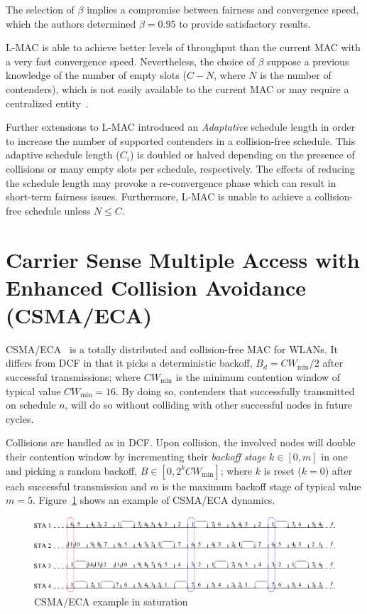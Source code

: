 \documentclass[a4paper,journal]{IEEEtran}
\begin{document}
The selection of $\beta$ implies a compromise between fairness and convergence speed, which the authors determined $\beta=0.95$ to provide satisfactory results.

L-MAC is able to achieve better levels of throughput than the current MAC with a very fast convergence speed. Nevertheless, the choice of $\beta$ suppose a previous knowledge of the number of empty slots ($C-N$, where $N$ is the number of contenders), which is not easily available to the current MAC or may require a centralized entity~\cite{barcelo2011tcf}.

Further extensions to L-MAC introduced an \emph{Adaptative} schedule length in order to increase the number of supported contenders in a collision-free schedule. This adaptive schedule length ($C_{i}$) is doubled or halved depending on the presence of collisions or many empty slots per schedule, respectively. The effects of reducing the schedule length may provoke a re-convergence phase which can result in short-term fairness issues. Furthermore, L-MAC is unable to achieve a collision-free schedule unless $N\leq C$.

\section{Carrier Sense Multiple Access with Enhanced Collision Avoidance (CSMA/ECA)}\label{introProtocol}
CSMA/ECA~\cite{barcelo2008lba} is a totally distributed and collision-free MAC for WLANs. It differs from DCF in that it picks a deterministic backoff, $B_{d}=CW_{\min}/2$ after successful transmissions; where $CW_{\min}$ is the minimum contention window of typical value $CW_{\min}=16$. By doing so, contenders that successfully transmitted on schedule $n$, will do so without colliding with other successful nodes in future cycles.

Collisions are handled as in DCF. Upon collision, the involved nodes will double their contention window by incrementing their \emph{backoff stage} $k\in[0,m]$ in one and picking a random backoff, $B\in[0,2^{k}CW_{\min}]$; where $k$ is reset ($k=0$) after each successful transmission and $m$ is the maximum backoff stage of typical value $m=5$. Figure~\ref{fig:BECA} shows an example of CSMA/ECA dynamics.

\begin{figure}[tbhp]
\centering
  \includegraphics[width=0.8\linewidth]{figures/basicECA.eps}
  \caption{CSMA/ECA example in saturation}
  \label{fig:BECA}
\end{figure}
\end{document}
